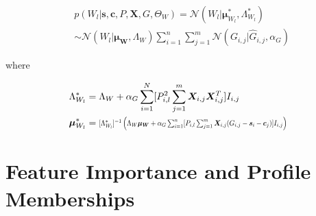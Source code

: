 \documentclass[10pt]{proc}
\begin{document}
\begin{mdframed}[style=eqbox]
{\setlength{\mathindent}{0cm}
\begin{align} \label{cpd-W}
    &p(W_l | \bm{s}, \bm{c}, P, \bm{X}, G, \Theta_W) =
        \mathcal{N}(W_l | \bm{\mu}_{W_l}^*, \Lambda_{W_l}^*) \\
        & \sim \mathcal{N}(W_l | \bm{\mu_W}, \Lambda_W)
            \sum_{i=1}^n \sum_{j=1}^m
                \mathcal{N}(G_{i,j} | \hat{G}_{i,j}, \alpha_G)
\end{align}

where

\begin{align}
    \Lambda_{W_l}^* &= \begin{aligned}[t]
        \Lambda_W + \alpha_G \sum_{i=1}^N
            [ P_{i,l}^2 \sum_{j=1}^m
                \bm{X}_{i,j} \bm{X}_{i,j}^T ] I_{i,j}
    \end{aligned}\\
%
    \bm{\mu}_{W_l}^* &= \begin{aligned}[t]
        \vstretch{0.8}{\hstretch{0.7}{
            [\Lambda_{W_l}^*]^{-1} \left(
                \Lambda_W\bm{\mu_W} +
                \alpha_G \sum_{i=1}^n
                    [P_{i,l} \sum_{j=1}^m
                        \bm{X}_{i,j}(G_{i,j} - \bm{s}_i - \bm{c}_j)
                    ] I_{i,j}
            \right)}}
    \end{aligned}
\end{align}}
\end{mdframed}


\section{Feature Importance and Profile Memberships}\label{imp-membs}
\end{document}
